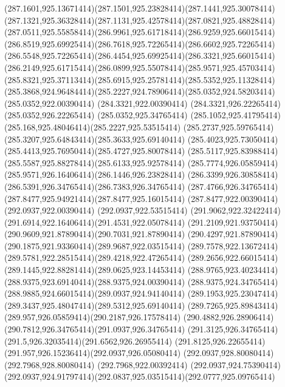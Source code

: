 {{	\curveto(287.1601,925.13671414)(287.1501,925.23828414)(287.1441,925.30078414)
	\curveto(287.1321,925.36328414)(287.1131,925.42578414)(287.0821,925.48828414)
	\curveto(287.0511,925.55858414)(286.9961,925.61718414)(286.9259,925.66015414)
	\curveto(286.8519,925.69925414)(286.7618,925.72265414)(286.6602,925.72265414)
	\curveto(286.5548,925.72265414)(286.4454,925.69925414)(286.3321,925.66015414)
	\curveto(286.2149,925.61715414)(286.0899,925.55078414)(285.9571,925.45703414)
	\curveto(285.8321,925.37113414)(285.6915,925.25781414)(285.5352,925.11328414)
	\curveto(285.3868,924.96484414)(285.2227,924.78906414)(285.0352,924.58203414)
	\lineto(285.0352,922.00390414)
	\lineto(284.3321,922.00390414)
	\lineto(284.3321,926.22265414)
	\lineto(285.0352,926.22265414)
	\lineto(285.0352,925.34765414)
	\curveto(285.1052,925.41795414)(285.168,925.48046414)(285.2227,925.53515414)
	\curveto(285.2737,925.59765414)(285.3207,925.64843414)(285.3633,925.69140414)
	\curveto(285.4023,925.73050414)(285.4413,925.76950414)(285.4727,925.80078414)
	\curveto(285.5117,925.83988414)(285.5587,925.88278414)(285.6133,925.92578414)
	\curveto(285.7774,926.05859414)(285.9571,926.16406414)(286.1446,926.23828414)
	\curveto(286.3399,926.30858414)(286.5391,926.34765414)(286.7383,926.34765414)
	\curveto(287.4766,926.34765414)(287.8477,925.94921414)(287.8477,925.16015414)
	\lineto(287.8477,922.00390414)
	\closepath
	\moveto(292.0937,922.00390414)
	\lineto(292.0937,922.53515414)
	\curveto(291.9062,922.32422414)(291.6914,922.16406414)(291.4531,922.05078414)
	\curveto(291.2109,921.93750414)(290.9609,921.87890414)(290.7031,921.87890414)
	\curveto(290.4297,921.87890414)(290.1875,921.93360414)(289.9687,922.03515414)
	\curveto(289.7578,922.13672414)(289.5781,922.28515414)(289.4218,922.47265414)
	\curveto(289.2656,922.66015414)(289.1445,922.88281414)(289.0625,923.14453414)
	\curveto(288.9765,923.40234414)(288.9375,923.69140414)(288.9375,924.00390414)
	\curveto(288.9375,924.34765414)(288.9885,924.66015414)(289.0937,924.94140414)
	\curveto(289.1953,925.23047414)(289.3437,925.48047414)(289.5312,925.69140414)
	\curveto(289.7265,925.89843414)(289.957,926.05859414)(290.2187,926.17578414)
	\curveto(290.4882,926.28906414)(290.7812,926.34765414)(291.0937,926.34765414)
	\curveto(291.3125,926.34765414)(291.5,926.32035414)(291.6562,926.26955414)
	\curveto(291.8125,926.22655414)(291.957,926.15236414)(292.0937,926.05080414)
	\lineto(292.0937,928.80080414)
	\lineto(292.7968,928.80080414)
	\lineto(292.7968,922.00392414)
	\closepath
	\moveto(292.0937,924.75390414)
	\curveto(292.0937,924.91797414)(292.0837,925.03515414)(292.0777,925.09765414)
}}
